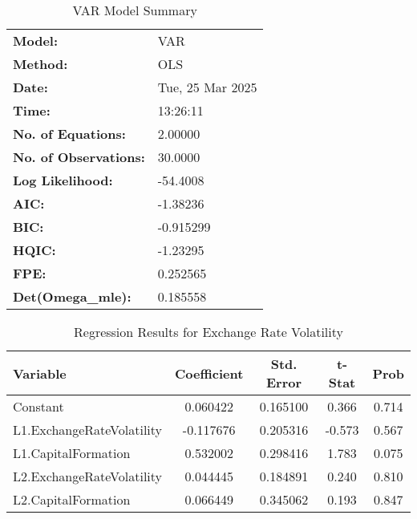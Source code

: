 \documentclass{article} %
\begin{document}
\begin{table}[h]
    \centering
    \caption{VAR Model Summary}
    \begin{tabular}{ll}
        \toprule
        \textbf{Model:}    & VAR \\
        \textbf{Method:}   & OLS \\
        \textbf{Date:}     & Tue, 25 Mar 2025 \\
        \textbf{Time:}     & 13:26:11 \\
        \midrule
        \textbf{No. of Equations:} & 2.00000 \\
        \textbf{No. of Observations:} & 30.0000 \\
        \textbf{Log Likelihood:} & -54.4008 \\
        \textbf{AIC:} & -1.38236 \\
        \textbf{BIC:} & -0.915299 \\
        \textbf{HQIC:} & -1.23295 \\
        \textbf{FPE:} & 0.252565 \\
        \textbf{Det(Omega\_mle):} & 0.185558 \\
        \bottomrule
    \end{tabular}
\end{table}


\begin{table}[h]
    \centering
    \caption{Regression Results for Exchange Rate Volatility}
    \begin{tabular}{lcccc}
        \toprule
        \textbf{Variable} & \textbf{Coefficient} & \textbf{Std. Error} & \textbf{t-Stat} & \textbf{Prob} \\
        \midrule
        Constant & 0.060422 & 0.165100 & 0.366 & 0.714 \\
        L1.ExchangeRateVolatility & -0.117676 & 0.205316 & -0.573 & 0.567 \\
        L1.CapitalFormation & 0.532002 & 0.298416 & 1.783 & 0.075 \\
        L2.ExchangeRateVolatility & 0.044445 & 0.184891 & 0.240 & 0.810 \\
        L2.CapitalFormation & 0.066449 & 0.345062 & 0.193 & 0.847 \\
        \bottomrule
    \end{tabular}
\end{table}
\end{document}
